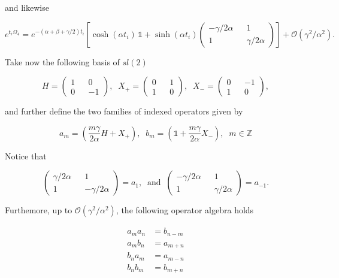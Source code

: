 \documentclass{article}
\newcommand{\bZ}{\mathbb{Z}}
\begin{document}
and likewise

\begin{equation}
  e^{t_i\Omega_4} = e^{-(\alpha +\beta+\gamma/2)t_i}\left [\cosh {(\alpha t_i)}\,\mathbb{1}
  + \sinh(\alpha t_i)\begin{pmatrix}    -\gamma/2\alpha && 1 \\ 1 && \gamma/2\alpha \end{pmatrix} \right] + \mathcal{O}(\gamma^2/\alpha^2).
\end{equation}



Take now the following basis of $sl(2)$

\begin{equation}
  H = \begin{pmatrix}1 && 0 \\ 0 && -1 \end{pmatrix}, \; \; X_+ = \begin{pmatrix}0 && 1 \\ 1 && 0 \end{pmatrix}, \;\; X_- = \begin{pmatrix}0 && -1 \\ 1 && 0 \end{pmatrix},
\end{equation}

and further define the two families of indexed operators given by

\begin{equation}
  a_m = \left(\frac{m\gamma}{2\alpha}H + X_+ \right), \; \;
  b_m = \left(\mathbb{1} + \frac{m\gamma}{2\alpha}X_-\right), \; \; m\in \bZ
\end{equation}

Notice that

$$\begin{pmatrix} \gamma/2\alpha && 1 \\ 1 && -\gamma/2\alpha \end{pmatrix} = a_1, \; \; \text{and} \; \;  \begin{pmatrix}    -\gamma/2\alpha && 1 \\ 1 && \gamma/2\alpha \end{pmatrix} = a_{-1}.$$

Furthemore, up to $\mathcal{O}(\gamma^2/\alpha^2)$, the following operator algebra holds

\begin{align}
  a_ma_n &= b_{n-m} \\
  a_mb_n &= a_{m+n} \\
  b_na_m &= a_{m-n} \\
  b_nb_m &= b_{m+n}
\end{align}
\end{document}
